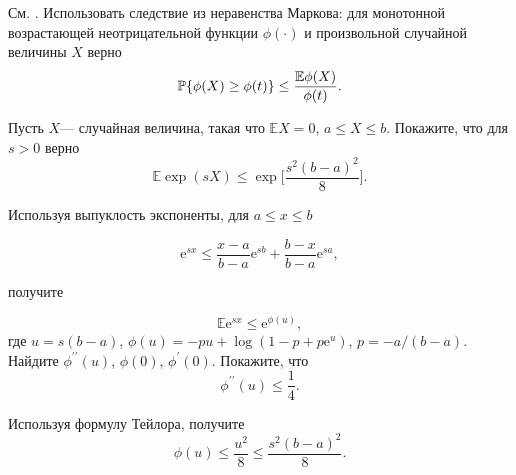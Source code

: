 \begin{ordre}См. \cite{BLM}. Использовать следствие из неравенства Маркова: для монотонной возрастающей неотрицательной функции $\phi(\cdot)$ и произвольной случайной величины $X$ верно
\begin{equation*}
\mathrm{{\mathbb P}}\{\phi(X)\geq \phi(t)\}\leq \frac{\mathbb{E}\phi(X)}{\phi(t)}.
\end{equation*}
\end{ordre}





\begin{problem} Пусть $X$--- случайная величина, такая что $\mathbb{E}X =0$, $a\leq X\leq b$. Покажите, что для $s>0$ верно
\begin{equation*}
\mathbb{E}\exp(s X)\leq \exp\bigg[\frac{s^2(b-a)^2}{8}\biggr].
\end{equation*}
\end{problem}

\begin{ordre}
Используя выпуклость экспоненты, для $a\leq x\leq b$

\begin{equation*}
\text{e}^{sx} \leq \frac{x-a}{b-a} \text{e}^{sb}+\frac{b-x}{b-a}\text{e}^{sa},
\end{equation*}

получите 

\begin{equation*}
\mathbb{E}\text{e}^{sx} \leq \text{e}^{\phi(u)},
\end{equation*}
где $u = s(b-a)$, $\phi(u) = -pu+\log(1-p+p\text{e}^u)$, $p = -a/(b-a)$.
Найдите $\phi^{\prime\prime}(u)$,   $\phi(0)$, $\phi^{\prime}(0)$.
Покажите, что 
\begin{equation*}
\phi^{\prime\prime}(u)\leq \frac{1}{4}.
\end{equation*}

Используя формулу Тейлора, получите 
\begin{equation*}
\phi(u) \leq \frac{u^2}{8}\leq \frac{s^2(b-a)^2}{8}.
\end{equation*}
\end{ordre}

